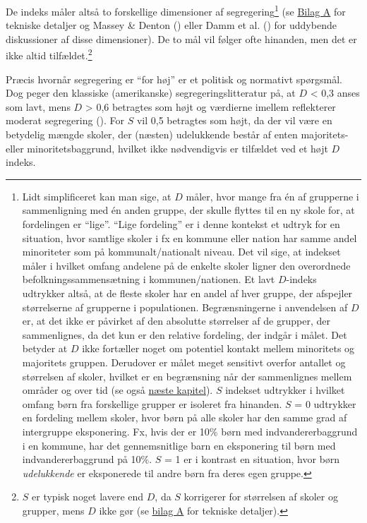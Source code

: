 \documentclass[
]{book}
\begin{document}
De indeks måler altså to forskellige dimensioner af segregering\footnote{Lidt simplificeret kan man sige, at \(D\) måler, hvor mange fra én af grupperne i sammenligning med én anden gruppe, der skulle flyttes til en ny skole for, at fordelingen er ``lige''. ``Lige fordeling'' er i denne kontekst et udtryk for en situation, hvor samtlige skoler i fx en kommune eller nation har samme andel minoriteter som på kommunalt/nationalt niveau. Det vil sige, at indekset måler i hvilket omfang andelene på de enkelte skoler ligner den overordnede befolkningssammensætning i kommunen/nationen. Et lavt \(D\)-indeks udtrykker altså, at de fleste skoler har en andel af hver gruppe, der afspejler størrelserne af grupperne i populationen. Begrænsningerne i anvendelsen af \(D\) er, at det ikke er påvirket af den absolutte størrelser af de grupper, der sammenlignes, da det kun er den relative fordeling, der indgår i målet. Det betyder at \(D\) ikke fortæller noget om potentiel kontakt mellem minoritets og majoritets gruppen. Derudover er målet meget sensitivt overfor antallet og størrelsen af skoler, hvilket er en begrænsning når der sammenlignes mellem områder og over tid (se også \hyperref[kap5]{næste kapitel}).
  \(S\) indekset udtrykker i hvilket omfang børn fra forskellige grupper er isoleret fra hinanden. \(S\) = 0 udtrykker en fordeling mellem skoler, hvor børn på alle skoler har den samme grad af intergruppe eksponering. Fx, hvis der er 10\% børn med indvandererbaggrund i en kommune, har det gennemsnitlige barn en eksponering til børn med indvandererbaggrund på 10\%. \(S\) = 1 er i kontrast en situation, hvor børn \emph{udelukkende} er eksponerede til andre børn fra deres egen gruppe.} (se \hyperref[ux5cux2520bilag1]{Bilag A} for tekniske detaljer og Massey \& Denton () eller Damm et al. () for uddybende diskussioner af disse dimensioner). De to mål vil følger ofte hinanden, men det er ikke altid tilfældet.\footnote{\(S\) er typisk noget lavere end \(D\), da \(S\) korrigerer for størrelsen af skoler og grupper, mens \(D\) ikke gør (se \hyperref[bilag1]{bilag A} for tekniske detaljer).}

Præcis hvornår segregering er ``for høj'' er et politisk og normativt spørgsmål. Dog peger den klassiske (amerikanske) segregeringslitteratur på, at \(D\) \textless{} 0,3 anses som lavt, mens \(D\) \textgreater{} 0,6 betragtes som højt og værdierne imellem reflekterer moderat segregering (). For \(S\) vil 0,5 betragtes som højt, da der vil være en betydelig mængde skoler, der (næsten) udelukkende består af enten majoritets- eller minoritetsbaggrund, hvilket ikke nødvendigvis er tilfældet ved et højt \(D\) indeks.
\end{document}
